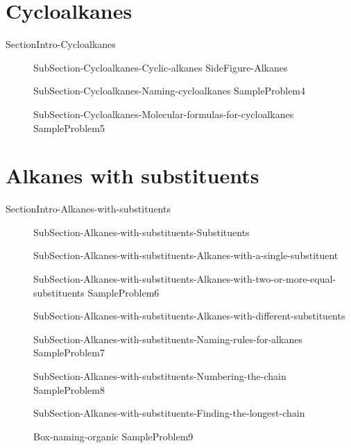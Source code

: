 \documentclass[main.tex]{subfiles}
\newcommand\chapterlabel{Ch-orgo}\setcounter{figurenewcounter}{0}\setcounter{tablenewcounter}{0}\setcounter{formulanewcounter}{0}
\begin{document}
\section{Cycloalkanes}{SectionIntro-Cycloalkanes}
\sloppy\begin{description}
\item[] {SubSection-Cycloalkanes-Cyclic-alkanes}
{SideFigure-Alkanes}
\item[]{SubSection-Cycloalkanes-Naming-cycloalkanes}
{SampleProblem4}
\item[]{SubSection-Cycloalkanes-Molecular-formulas-for-cycloalkanes}
{SampleProblem5}
\end{description}


 
\section{Alkanes with substituents}{SectionIntro-Alkanes-with-substituents}
\sloppy\begin{description}
\item[]{SubSection-Alkanes-with-substituents-Substituents}
\item[]{SubSection-Alkanes-with-substituents-Alkanes-with-a-single-substituent}
\newpage\hspace{-3cm}{Table-Substituents}
\item[]{SubSection-Alkanes-with-substituents-Alkanes-with-two-or-more-equal-substituents}
{SampleProblem6}
\item[]{SubSection-Alkanes-with-substituents-Alkanes-with-different-substituents}
\item[]{SubSection-Alkanes-with-substituents-Naming-rules-for-alkanes}
{SampleProblem7}
\item[]{SubSection-Alkanes-with-substituents-Numbering-the-chain}
{SampleProblem8}
\item[]{SubSection-Alkanes-with-substituents-Finding-the-longest-chain}
\item[]{Box-naming-organic} 
{SampleProblem9}
\end{description}
\end{document}
